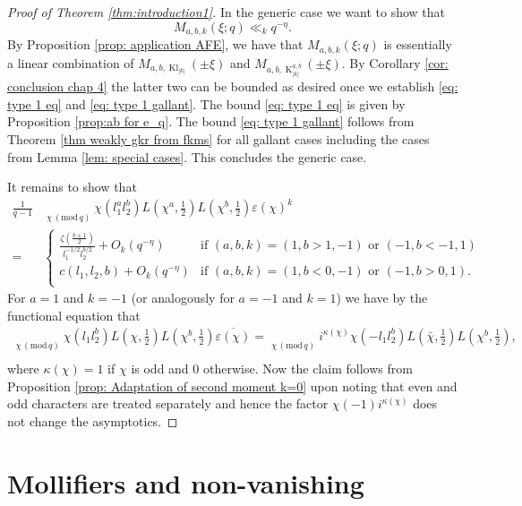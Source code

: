 \documentclass[12pt]{amsart}
\theoremstyle{plain}
\theoremstyle{definition}
\theoremstyle{remark}
\numberwithin{equation}{section}
\newcommand\sumst{\mathop{{\sum}^\ast}\limits}
\newcommand{\mods}[1]{\,(\mathrm{mod}\,{#1})}
\DeclareMathOperator{\Kl}{Kl}%
\DeclareMathOperator{\K}{K} %
\begin{document}
\begin{proof}[Proof of Theorem \ref{thm:introduction1}] 
In the generic case we want to show that 
$$M_{a,b,k}(\xi;q)\ll_k q^{-\eta}.$$
By Proposition \ref{prop: application AFE}, we have that $M_{a,b,k}(\xi;q)$ is essentially a linear combination of $M_{a,b,\Kl_{|k|}}(\pm\xi)$ and $M_{a,b,\K_{|k|}^{a,b}}(\pm\xi)$. By Corollary \ref{cor: conclusion chap 4} the latter two can be bounded as desired once we establish \eqref{eq: type 1 eq} and \eqref{eq: type 1 gallant}.
The bound \eqref{eq: type 1 eq} is given by Proposition \ref{prop:ab for e_q}. The bound \eqref{eq: type 1 gallant} follows from Theorem \ref{thm weakly gkr from fkms} for all gallant cases including the cases from Lemma \ref{lem: special cases}.
This concludes the generic case. 




It remains to show that
    \begin{align*}
        \frac{1}{q-1}&\sumst_{\chi \mods{q}}\chi(l_1^al_2^b)L\left(\chi^a,\tfrac{1}{2}\right)L\left(\chi^b,\tfrac{1}{2}\right)\varepsilon(\chi)^k \\  
     =&\begin{cases} \frac{\zeta(\frac{b+1}{2})}{l_1^{-1/2}l_2^{b/2}}+ O_k( q^{-\eta}) &\text{if }(a,b,k)=(1,b>1,-1) \text{ or } (-1,b<-1,1) \\
          c(l_1,l_2,b)+ O_k( q^{-\eta}) &\text{if }(a,b,k)=(1,b<0,-1) \text{ or } (-1,b>0,1). \\
        \end{cases}
    \end{align*}
For $a=1$ and $k=-1$ (or analogously for $a=-1$ and $k=1$) we have by the functional equation that 
\begin{align*}
    \sumst_{\chi \mods q}\chi(l_1l_2^b)L(\chi,\tfrac 12)L(\chi^b,\tfrac 12)\overline{\varepsilon( \chi)}=\sumst_{ \chi \mods q}i^{\kappa(\chi)}\chi(-l_1l_2^b)L(\bar \chi,\tfrac 12)L(\chi^b,\tfrac 12) ,\\
\end{align*}
where $\kappa(\chi)=1$ if $\chi$ is odd and 0 otherwise.  Now the claim follows from Proposition \ref{prop: Adaptation of second moment k=0} upon noting that even and odd characters are treated separately and hence the factor $\chi(-1)i^{\kappa(\chi)}$ does not change the asymptotics. 
\end{proof}



\section{Mollifiers and non-vanishing}\label{s: non-vanishing}
\end{document}
